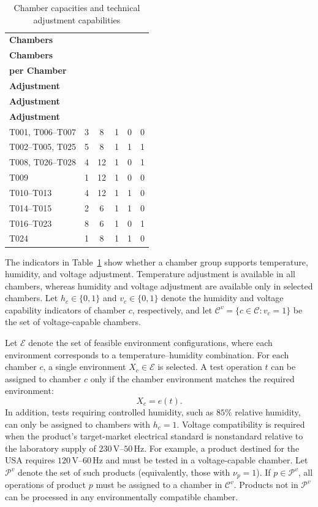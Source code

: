 \begin{table}[H]
\centering
\caption{Chamber capacities and technical adjustment capabilities}
\label{tab:chamber_capabilities}
\footnotesize
\setlength{\tabcolsep}{3pt}
\renewcommand{\arraystretch}{0.9}
\begin{tabular}{lccccc}
\hline
\textbf{Chambers} &
\shortstack{\textbf{No. of}\\\textbf{Chambers}} &
\shortstack{\textbf{Stations}\\\textbf{per Chamber}} &
\shortstack{\textbf{Temperature}\\\textbf{Adjustment}} &
\shortstack{\textbf{Humidity}\\\textbf{Adjustment}} &
\shortstack{\textbf{Voltage}\\\textbf{Adjustment}} \\
\hline
T001, T006--T007 & 3 & 8  & 1 & 0 & 0 \\
T002--T005, T025 & 5 & 8  & 1 & 1 & 1 \\
T008, T026--T028 & 4 & 12 & 1 & 0 & 1 \\
T009 & 1 & 12 & 1 & 0 & 0 \\
T010--T013 & 4 & 12 & 1 & 1 & 0 \\
T014--T015 & 2 & 6  & 1 & 1 & 0 \\
T016--T023 & 8 & 6  & 1 & 0 & 1 \\
T024 & 1 & 8  & 1 & 1 & 0 \\
\hline
\end{tabular}
\end{table}

The indicators in Table~\ref{tab:chamber_capabilities} show whether a chamber group supports temperature, humidity, and voltage adjustment. Temperature adjustment is available in all chambers, whereas humidity and voltage adjustment are available only in selected chambers. Let \(h_c\in\{0,1\}\) and \(v_c\in\{0,1\}\) denote the humidity and voltage capability indicators of chamber \(c\), respectively, and let \(\mathcal{C}^v=\{c\in\mathcal{C}:v_c=1\}\) be the set of voltage-capable chambers.

Let \(\mathcal{E}\) denote the set of feasible environment configurations, where each environment corresponds to a temperature--humidity combination. For each chamber \(c\), a single environment \(X_c\in\mathcal{E}\) is selected. A test operation \(t\) can be assigned to chamber \(c\) only if the chamber environment matches the required environment:
\[
X_c=e(t).
\]
In addition, tests requiring controlled humidity, such as \(85\%\) relative humidity, can only be assigned to chambers with \(h_c=1\). Voltage compatibility is required when the product's target-market electrical standard is nonstandard relative to the laboratory supply of \(230\,\mathrm{V}\)--\(50\,\mathrm{Hz}\). For example, a product destined for the USA requires \(120\,\mathrm{V}\)--\(60\,\mathrm{Hz}\) and must be tested in a voltage-capable chamber. Let \(\mathcal{P}^v\) denote the set of such products (equivalently, those with \(\nu_p=1\)). If \(p\in\mathcal{P}^v\), all operations of product \(p\) must be assigned to a chamber in \(\mathcal{C}^v\). Products not in \(\mathcal{P}^v\) can be processed in any environmentally compatible chamber.

